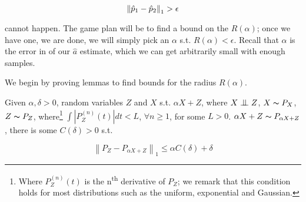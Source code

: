 $$
    \left\lVert\hat{p}_1 - \hat{p}_2\right\rVert_1 > \epsilon
$$

cannot happen. The game plan will be to find a bound on the $R(\alpha)$; once we have one, we are done, we 
will simply pick an $\alpha$ s.t. $R(\alpha) < \epsilon$. Recall that $\alpha$ is the error in of our $\hat{a}$
estimate, which we can get arbitrarily small with enough samples. 

We begin by proving lemmas to find bounds for the radius $R(\alpha)$.

\begin{lemma} 
    
    Given $\alpha, \delta > 0$, random variables $Z$ and $X$ s.t. $\alpha X + Z$, where $X \bigCI Z$, 
$X \thicksim P_X$, $Z \thicksim P_Z$, where\footnote{
    Where $P_{Z}^{(n)}(t)$ is the n\textsuperscript{th} derivative of $P_Z$; we remark that this 
    condition holds for most distributions such as the uniform, exponential and Gaussian.} 
$\int \left| P_{Z}^{(n)}(t) \right| d t < L$, $\forall n\geq 1$, for some $L > 0$.
$\alpha X + Z \thicksim  P_{\alpha X + Z}$, there is some $C(\delta) > 0$ s.t.

$$
\left\|P_{Z} -  P_{\alpha X + Z} \right\|_{1} \leqslant \alpha C(\delta) + \delta
$$
\label{lemma:conv_bound}
\end{lemma}

 

